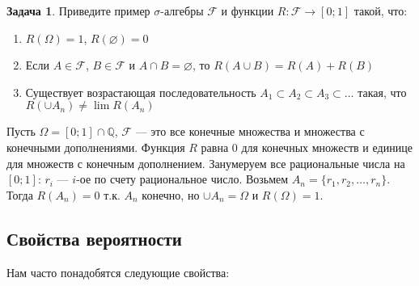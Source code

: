 \documentclass[pdftex, 12pt, a4paper]{article}
\def\F{\ensuremath{\mathcal{F}}} %
\renewcommand{\to}{\rightarrow}
\theoremstyle{definition} %
\newtheorem{problem}{Задача}
\numberwithin{problem}{section}
\numberwithin{blits}{section}
\begin{document}
\begin{problem}
Приведите пример $ \sigma $-алгебры $ \mathcal{F} $ и функции $ R:\mathcal{F}\to [0;1] $ такой, что:
\begin{enumerate}
\item $ R(\Omega)=1 $, $ R(\varnothing)=0 $
\item Если $ A\in \F $, $B\in \F  $ и $ A\cap B=\varnothing$, то $ R(A\cup B)=R(A)+R(B) $
\item Существует возрастающая последовательность $ A_{1}\subset A_{2}\subset A_{3}\subset \ldots $ такая, что $ R(\cup A_{n})\neq \lim R(A_{n}) $
\end{enumerate}
\begin{sol}
Пусть $ \Omega=[0;1]\cap \mathbb{Q} $, $ \mathcal{F} $ --- это все конечные множества и множества с конечными дополнениями.  Функция $ R $ равна 0 для конечных множеств и единице для множеств с конечным дополнением. Занумеруем все рациональные числа на $ [0;1] $: $ r_{i} $ --- $ i $-ое по счету рациональное число. Возьмем $ A_{n}=\{r_{1},r_{2},\ldots ,r_{n}\} $. Тогда $ R(A_{n})=0 $ т.к. $ A_{n} $ конечно, но $ \cup A_{n}=\Omega $ и $ R(\Omega)=1 $.
\end{sol}
\end{problem}


\subsection{Свойства вероятности}

Нам часто понадобятся следующие свойства:
\end{document}

